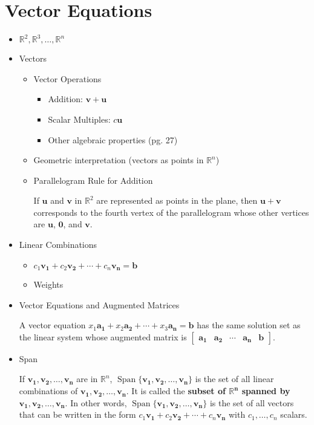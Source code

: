 \documentclass[10pt]{book}
\newenvironment{boxdef}{\begin{mdframed}[backgroundcolor=gray!30,linewidth=0pt,nobreak=true]}{\end{mdframed}}
\newcommand{\R}{\mathbb{R}}
\newcommand{\vect}[1]{\ensuremath{\boldsymbol{\mathbf{#1}}}}
\DeclareMathOperator{\Span}{Span}
\begin{document}
\section{Vector Equations}
\begin{itemize}
	\item $\R^2,\R^3,\ldots,\R^n$
	\item Vectors
		\begin{itemize}
			\item Vector Operations
				\begin{itemize}
					\item Addition: $\vect{v}+\vect{u}$
					\item Scalar Multiples: $c\vect{u}$
					\item Other algebraic properties (pg. 27)
				\end{itemize}
			\item Geometric interpretation (vectors as points in $\R^n$)
			\item Parallelogram Rule for Addition
				\begin{boxdef}
					If $\vect{u}$ and $\vect{v}$ in $\R^2$ are represented as points in the plane, then $\vect{u}+\vect{v}$ corresponds to the fourth vertex of the parallelogram whose other vertices are $\vect{u}$, $\vect{0}$, and $\vect{v}$.
				\end{boxdef}
		\end{itemize}
	\item Linear Combinations
		\begin{itemize}
			\item $c_1\vect{v_1}+c_2\vect{v_2}+\cdots+c_n\vect{v_n}=\vect{b}$
			\item Weights
		\end{itemize}
	\item Vector Equations and Augmented Matrices
		\begin{boxdef}
			A vector equation $x_1\vect{a_1}+x_2\vect{a_2}+\cdots+x_3\vect{a_n}=\vect{b}$ has the same solution set as the linear system whose augmented matrix is $\begin{bmatrix}\vect{a_1}&\vect{a_2}&\cdots&\vect{a_n}&\vect{b}\end{bmatrix}$.
		\end{boxdef}
	\item Span
		\begin{boxdef}
			If $\vect{v_1},\vect{v_2},\ldots,\vect{v_n}$ are in $\R^n$, $\Span\{\vect{v_1},\vect{v_2},\ldots,\vect{v_n}\}$ is the set of all linear combinations of $\vect{v_1},\vect{v_2},\ldots,\vect{v_n}$. It is called the \textbf{subset of $\boldsymbol{\R^n}$ spanned by $\vect{v_1},\vect{v_2},\ldots,\vect{v_n}$}. In other words, $\Span\{\vect{v_1},\vect{v_2},\ldots,\vect{v_n}\}$ is the set of all vectors that can be written in the form $c_1\vect{v_1}+c_2\vect{v_2}+\cdots+c_n\vect{v_n}$ with $c_1,\ldots,c_n$ scalars.

\end{boxdef}
\end{itemize}
\end{document}
